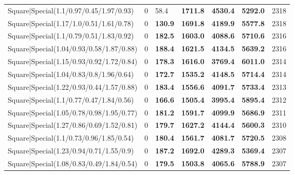 \begin{tabular}{lrllllr}
 Square|Special(1.1/0.97/0.45/1.97/0.93)                       &             0   & 58.4           & \textbf{1711.8} & \textbf{4530.4} & \textbf{5292.0} &         2318 \\
 Square|Special(1.17/1.0/0.51/1.61/0.78)                       &             0   & \textbf{130.9} & \textbf{1691.8} & \textbf{4189.9} & \textbf{5577.8} &         2318 \\
 Square|Special(1.1/0.79/0.51/1.83/0.92)                       &             0   & \textbf{182.5} & \textbf{1603.0} & \textbf{4088.6} & \textbf{5710.6} &         2316 \\
 Square|Special(1.04/0.93/0.58/1.87/0.88)                      &             0   & \textbf{188.4} & \textbf{1621.5} & \textbf{4134.5} & \textbf{5639.2} &         2316 \\
 Square|Special(1.15/0.93/0.92/1.72/0.84)                      &             0   & \textbf{178.3} & \textbf{1616.0} & \textbf{3769.4} & \textbf{6011.0} &         2314 \\
 Square|Special(1.04/0.83/0.8/1.96/0.64)                       &             0   & \textbf{172.7} & \textbf{1535.2} & \textbf{4148.5} & \textbf{5714.4} &         2314 \\
 Square|Special(1.22/0.93/0.44/1.57/0.88)                      &             0   & \textbf{183.4} & \textbf{1556.6} & \textbf{4091.7} & \textbf{5733.4} &         2313 \\
 Square|Special(1.1/0.77/0.47/1.84/0.56)                       &             0   & \textbf{166.6} & \textbf{1505.4} & \textbf{3995.4} & \textbf{5895.4} &         2312 \\
 Square|Special(1.05/0.78/0.98/1.95/0.77)                      &             0   & \textbf{181.2} & \textbf{1591.7} & \textbf{4099.9} & \textbf{5686.9} &         2311 \\
 Square|Special(1.27/0.86/0.69/1.52/0.81)                      &             0   & \textbf{179.7} & \textbf{1627.2} & \textbf{4144.4} & \textbf{5600.3} &         2310 \\
 Square|Special(1.1/0.73/0.96/1.85/0.54)                       &             0   & \textbf{180.4} & \textbf{1561.7} & \textbf{4081.7} & \textbf{5720.5} &         2308 \\
 Square|Special(1.23/0.94/0.71/1.55/0.9)                       &             0   & \textbf{187.2} & \textbf{1692.0} & \textbf{4289.3} & \textbf{5369.4} &         2307 \\
 Square|Special(1.08/0.83/0.49/1.84/0.54)                      &             0   & \textbf{179.5} & \textbf{1503.8} & \textbf{4065.6} & \textbf{5788.9} &         2307 \\

\end{tabular}
